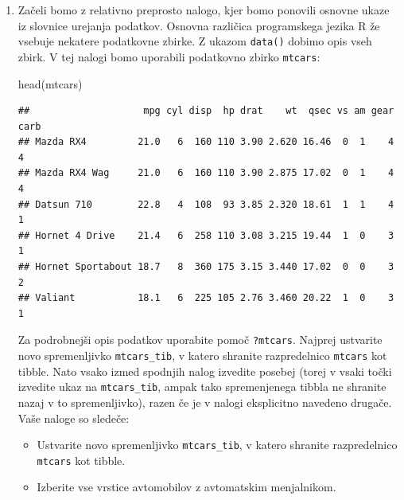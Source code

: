 \documentclass[
]{book}
\newenvironment{Shaded}{\begin{snugshade}}{\end{snugshade}}
\newcommand{\FunctionTok}[1]{\textcolor[rgb]{0.00,0.00,0.00}{#1}}
\newcommand{\NormalTok}[1]{#1}
\providecommand{\tightlist}{%
  \setlength{\itemsep}{0pt}\setlength{\parskip}{0pt}}
\begin{document}
\begin{enumerate}
\def\labelenumi{\arabic{enumi})}
\item
  Začeli bomo z relativno preprosto nalogo, kjer bomo ponovili osnovne ukaze iz slovnice urejanja podatkov. Osnovna različica programskega jezika R že vsebuje nekatere podatkovne zbirke. Z ukazom \texttt{data()} dobimo opis vseh zbirk. V tej nalogi bomo uporabili podatkovno zbirko \texttt{mtcars}:

\begin{Shaded}
\begin{Highlighting}[]
\FunctionTok{head}\NormalTok{(mtcars)}
\end{Highlighting}
\end{Shaded}

\begin{verbatim}
##                    mpg cyl disp  hp drat    wt  qsec vs am gear carb
## Mazda RX4         21.0   6  160 110 3.90 2.620 16.46  0  1    4    4
## Mazda RX4 Wag     21.0   6  160 110 3.90 2.875 17.02  0  1    4    4
## Datsun 710        22.8   4  108  93 3.85 2.320 18.61  1  1    4    1
## Hornet 4 Drive    21.4   6  258 110 3.08 3.215 19.44  1  0    3    1
## Hornet Sportabout 18.7   8  360 175 3.15 3.440 17.02  0  0    3    2
## Valiant           18.1   6  225 105 2.76 3.460 20.22  1  0    3    1
\end{verbatim}

  Za podrobnejši opis podatkov uporabite pomoč \texttt{?mtcars}. Najprej ustvarite novo spremenljivko \texttt{mtcars\_tib}, v katero shranite razpredelnico \texttt{mtcars} kot tibble. Nato vsako izmed spodnjih nalog izvedite posebej (torej v vsaki točki izvedite ukaz na \texttt{mtcars\_tib}, ampak tako spremenjenega tibbla ne shranite nazaj v to spremenljivko), razen če je v nalogi eksplicitno navedeno drugače. Vaše naloge so sledeče:

  \begin{itemize}
  \tightlist
  \item
    Ustvarite novo spremenljivko \texttt{mtcars\_tib}, v katero shranite razpredelnico \texttt{mtcars} kot tibble.
  \item
    Izberite vse vrstice avtomobilov z avtomatskim menjalnikom.
  \end{itemize}


\end{enumerate}
\end{document}
